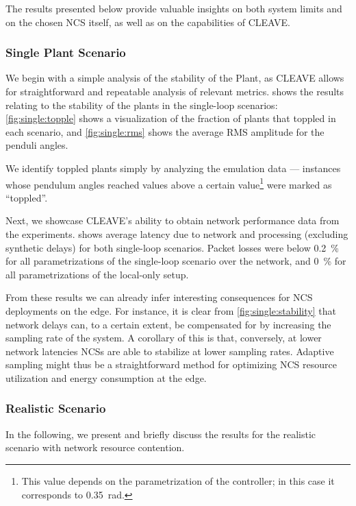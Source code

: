 The results presented below provide valuable insights on both system limits and on the chosen \ac{NCS} itself, as well as on the capabilities of \ac{CLEAVE}.

\subsubsection{Single Plant Scenario}

We begin with a simple analysis of the stability of the Plant, as \ac{CLEAVE} allows for straightforward and repeatable analysis of relevant metrics.  
 shows the results relating to the stability of the plants in the single-loop scenarios:
\cref{fig:single:topple} shows a visualization of the fraction of plants that toppled in each scenario, and \cref{fig:single:rms} shows the average \ac{RMS} amplitude for the penduli angles.

We identify toppled plants simply by analyzing the emulation data --- instances whose pendulum angles reached values above a certain value\footnote{This value depends on the parametrization of the controller; in this case it corresponds to \SI{0.35}{\radian}.} were marked as ``toppled''.

Next, we showcase \ac{CLEAVE}'s ability to obtain network performance data from the experiments.
 shows average latency due to network and processing (excluding synthetic delays) for both single-loop scenarios.
Packet losses were below \SI{0.2}{\percent} for all parametrizations of the single-loop scenario over the network, and \SI{0}{\percent} for all parametrizations of the local-only setup.

From these results we can already infer interesting consequences for \ac{NCS} deployments on the edge.
For instance, it is clear from \cref{fig:single:stability} that network delays can, to a certain extent, be compensated for by increasing the sampling rate of the system.
A corollary of this is that, conversely, at lower network latencies \acp{NCS} are able to stabilize at lower sampling rates.
Adaptive sampling might thus be a straightforward method for optimizing \ac{NCS} resource utilization and energy consumption at the edge.

\subsubsection{Realistic Scenario}

In the following, we present and briefly discuss the results for the realistic scenario with network resource contention.


